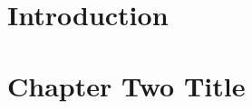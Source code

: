 \documentclass[12pt]{report}
\begin{document}






\tableofcontents

\chapter{Introduction}


\chapter{Chapter Two Title}


%
\end{document}
